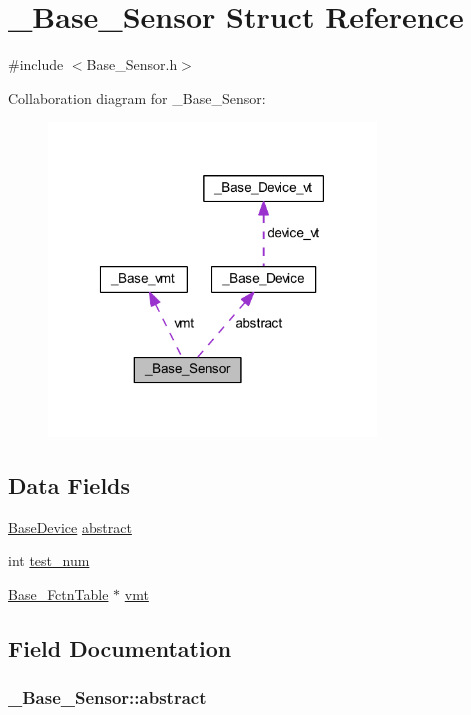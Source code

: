 \hypertarget{struct___base___sensor}{\section{\-\_\-\-Base\-\_\-\-Sensor Struct Reference}
\label{struct___base___sensor}
}


{\ttfamily \#include $<$Base\-\_\-\-Sensor.\-h$>$}



Collaboration diagram for \-\_\-\-Base\-\_\-\-Sensor\-:
\nopagebreak
\begin{figure}[H]
\begin{center}
\leavevmode
\includegraphics[width=247pt]{struct___base___sensor__coll__graph}
\end{center}
\end{figure}
\subsection*{Data Fields}
\begin{DoxyCompactItemize}
\item 
\hyperlink{_base___device_8h_a35346bbd80cb3a10fa241ce386fb7e79}{Base\-Device} \hyperlink{struct___base___sensor_ab5b10e7865be90105d136dcd5a652d54}{abstract}
\item 
int \hyperlink{struct___base___sensor_a8867289889dfcd9c796f8051e0502dda}{test\-\_\-num}
\item 
\hyperlink{_base___sensor_8h_ab5e6eb0bf1dd1e4f69e57e64004c939f}{Base\-\_\-\-Fctn\-Table} $\ast$ \hyperlink{struct___base___sensor_a45814e02e1525822b3efeae0bc06cea1}{vmt}
\end{DoxyCompactItemize}


\subsection{Field Documentation}
\hypertarget{struct___base___sensor_ab5b10e7865be90105d136dcd5a652d54}{
\subsubsection[{abstract}]{ \-\_\-\-Base\-\_\-\-Sensor\-::abstract}}\label{struct___base___sensor_ab5b10e7865be90105d136dcd5a652d54}


